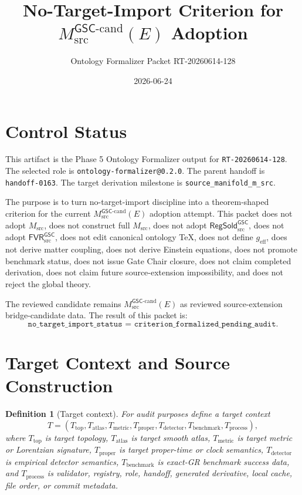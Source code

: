 \documentclass[11pt]{article}
\title{No-Target-Import Criterion for \(M_{\mathrm{src}}^{\mathsf{GSC}\mbox{-}\mathrm{cand}}(E)\) Adoption}
\author{Ontology Formalizer Packet RT-20260614-128}
\date{2026-06-24}
\newcommand{\GSC}{\mathsf{GSC}}
\newcommand{\Msrc}{M_{\mathrm{src}}}
\newcommand{\Mgsccand}{M_{\mathrm{src}}^{\GSC\mbox{-}\mathrm{cand}}}
\newcommand{\Tctx}{T}
\newcommand{\TopT}{T_{\mathrm{top}}}
\newcommand{\AtlasT}{T_{\mathrm{atlas}}}
\newcommand{\MetricT}{T_{\mathrm{metric}}}
\newcommand{\ProperT}{T_{\mathrm{proper}}}
\newcommand{\DetectorT}{T_{\mathrm{detector}}}
\newcommand{\BenchmarkT}{T_{\mathrm{benchmark}}}
\newcommand{\ProcessT}{T_{\mathrm{process}}}
\newcommand{\geff}{g_{\mathrm{eff}}}
\newtheorem{definition}{Definition}
\begin{document}
\maketitle

\section{Control Status}

This artifact is the Phase 5 Ontology Formalizer output for
\texttt{RT-20260614-128}. The selected role is
\texttt{ontology-formalizer@0.2.0}. The parent handoff is
\texttt{handoff-0163}. The target derivation milestone is
\texttt{source\_manifold\_m\_src}.

The purpose is to turn no-target-import discipline into a theorem-shaped
criterion for the current \(\Mgsccand(E)\) adoption attempt. This packet does
not adopt \(\Msrc\), does not construct full \(\Msrc\), does not adopt
\(\mathsf{RegSold}_{\mathrm{src}}^{\GSC}\), does not adopt
\(\mathsf{FVR}_{\mathrm{src}}^{\GSC}\), does not edit canonical ontology TeX,
does not define \(\geff\), does not derive matter coupling, does not derive
Einstein equations, does not promote benchmark status, does not issue Gate
Chair closure, does not claim completed derivation, does not claim future
source-extension impossibility, and does not reject the global theory.

The reviewed candidate remains \(\Mgsccand(E)\) as reviewed source-extension
bridge-candidate data. The result of this packet is:
\[
  \texttt{no\_target\_import\_status =
  criterion\_formalized\_pending\_audit}.
\]

\section{Target Context and Source Construction}

\begin{definition}[Target context]
For audit purposes define a target context
\[
  \Tctx =
  (\TopT,\AtlasT,\MetricT,\ProperT,\DetectorT,\BenchmarkT,\ProcessT),
\]
where \(\TopT\) is target topology, \(\AtlasT\) is target smooth atlas,
\(\MetricT\) is target metric or Lorentzian signature, \(\ProperT\) is target
proper-time or clock semantics, \(\DetectorT\) is empirical detector
semantics, \(\BenchmarkT\) is exact-GR benchmark success data, and
\(\ProcessT\) is validator, registry, role, handoff, generated derivative,
local cache, file order, or commit metadata.
\end{definition}
\end{document}
